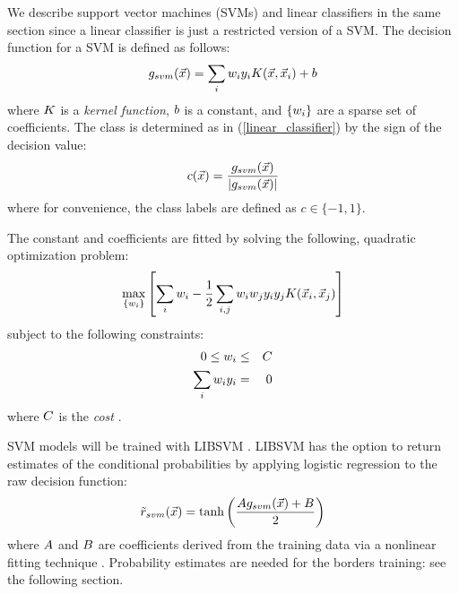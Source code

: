 We describe support vector machines (SVMs) and linear classifiers in the same
section since a linear classifier is just a restricted version of a SVM.
The decision function for a SVM is defined as follows:
\begin{equation}
	g_{svm}(\vec {x}) = \sum_i w_i y_i K (\vec {x}, \vec {x}_i) + b
	\label{svm_decision}
\end{equation}
where $K$ is a {\it kernel function}, $b$ is a
constant, and $\lbrace w_i \rbrace$ are a sparse set of coefficients.
The class is determined as in (\ref{linear_classifier}) by the sign of the decision value:
\begin{equation}
	c(\vec {x}) = \frac{g_{svm}(\vec {x})}{|g_{svm}(\vec {x})|}
	\label{class_value}
\end{equation}
where for convenience, the class labels are defined as
$c \in \lbrace -1, 1 \rbrace$.

The constant and coefficients are fitted by solving the following, quadratic
optimization problem:
\begin{equation}
	\max_{\lbrace w_i \rbrace} \left [ \sum_i w_i 
	- \frac{1}{2} \sum_{i, j} w_i w_j y_i y_j K(\vec {x}_i, \vec {x}_j) \right ] \label{dual_problem}
\end{equation}
subject to the following constraints:
\begin{eqnarray}
	0 \le w_i & \le & C \label{constraint1} \\
	\sum_i w_i y_i & = & 0 \label{constraint2}
\end{eqnarray}
where $C$ is the {\it cost} \citep{Mueller_etal2001,Chang_Lin2011}.

SVM models will be trained with LIBSVM \citep{Chang_Lin2011}.
LIBSVM has the option to return estimates of the conditional 
probabilities by applying logistic regression to the raw decision function:
\begin{equation}
	\tilde r_{svm}(\vec {x}) = \tanh \left (\frac{A g_{svm}(\vec {x})+ B}{2} \right )
	\label{svm_prob}
\end{equation}
where $A$ and $B$ are coefficients derived from
the training data via a nonlinear fitting technique \citep{Platt1999,Lin_etal2007}.
Probability estimates are needed for the borders training: see the following
section.

